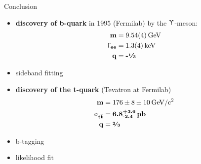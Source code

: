 \begin{frame}{Conclusion}

	\begin{itemize}
		\itemfill
		\item \textbf{discovery of b-quark} in 1995 (Fermilab) by the $\Upupsilon$-meson:
		{\begin{align*}
			\z{\textbf{m}} 						&= \textbf{\SI{9.54\pm.04}{\giga\electronvolt}}\\
			\mathbf{\Upgamma}_{\z{\textbf{ee}}}	&= \textbf{\SI{1.3\pm.4}{\kilo\electronvolt}}\\
			\z{\textbf{q}}						&= \textbf{-\sfrac{1}{3}}
		\end{align*}}\vspace*{-10pt}
		\item sideband fitting
		\item \textbf{discovery of the t-quark} (Tevatron at Fermilab)
		{\begin{align*}
			\z{\textbf{m}} 						&= \textbf{\SI[parse-numbers=false]{176\pm8\pm10}{\giga\electronvolt\per c^2}}\\
				\mathbf{\upsigma}_{\z{\textbf{t}}\overline{\z{\textbf{t}}}} &= \textbf{6.8}^{\textbf{+3.6}}_{\textbf{-2.4}}\,\z{\textbf{pb}}\\
			\z{\textbf{q}}						&= \textbf{\sfrac{2}{3}}
		\end{align*}}\vspace*{-10pt}
		\item b-tagging
		\item likelihood fit
	\end{itemize}
	
\end{frame}
